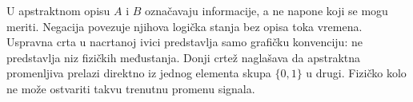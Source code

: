 U apstraktnom opisu $A$ i $B$ označavaju informacije, a ne napone koji se mogu meriti. Negacija povezuje njihova logička stanja bez opisa toka vremena. Uspravna crta u nacrtanoj ivici predstavlja samo grafičku konvenciju: ne predstavlja niz fizičkih međustanja. Donji crtež naglašava da apstraktna promenljiva prelazi direktno iz jednog elementa skupa $\{0,1\}$ u drugi. Fizičko kolo ne može ostvariti takvu trenutnu promenu signala.
